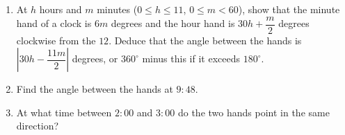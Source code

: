 \begin{enumerate}
\item[(a)] At $h$ hours and $m$ minutes ($0\le h\le11$, $0\le m<60$), show that the minute hand of a clock is $6m$ degrees and the hour hand is $30h+\dfrac m2$ degrees clockwise from the $12$. Deduce that the angle between the hands is $\left|30h-\dfrac{11m}{2}\right|$ degrees, or $360^\circ$ minus this if it exceeds $180^\circ$.
\item[(b)] Find the angle between the hands at $9{:}48$.
\item[(c)] At what time between $2{:}00$ and $3{:}00$ do the two hands point in the same direction?
\end{enumerate}
